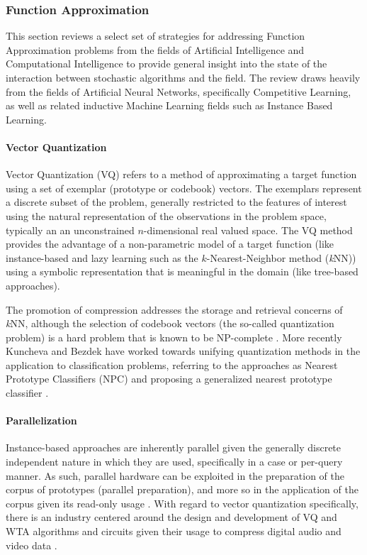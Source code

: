 %
%
\subsubsection{Function Approximation}
This section reviews a select set of strategies for addressing Function Approximation problems from the fields of Artificial Intelligence and Computational Intelligence to provide general insight into the state of the interaction between stochastic algorithms and the field. The review draws heavily from the fields of Artificial Neural Networks, specifically Competitive Learning, as well as related inductive Machine Learning fields such as Instance Based Learning.

\paragraph{Vector Quantization}
Vector Quantization (VQ) refers to a method of approximating a target function using a set of exemplar (prototype or codebook) vectors. The exemplars represent a discrete subset of the problem, generally restricted to the features of interest using the natural representation of the observations in the problem space, typically an an unconstrained $n$-dimensional real valued space. The VQ method provides the advantage of a non-parametric model of a target function (like instance-based and lazy learning such as the $k$-Nearest-Neighbor method (\emph{k}NN)) using a symbolic representation that is meaningful in the domain (like tree-based approaches). 

The promotion of compression addresses the storage and retrieval concerns of \emph{k}NN, although the selection of codebook vectors (the so-called quantization problem) is a hard problem that is known to be NP-complete \cite{Garey1982}. More recently Kuncheva and Bezdek have worked towards unifying quantization methods in the application to classification problems, referring to the approaches as Nearest Prototype Classifiers (NPC) and proposing a generalized nearest prototype classifier \cite{Kuncheva1998, Kuncheva1998a}.
	
\paragraph{Parallelization} 
Instance-based approaches are inherently parallel given the generally discrete independent nature in which they are used, specifically in a case or per-query manner. As such, parallel hardware can be exploited in the preparation of the corpus of prototypes (parallel preparation), and more so in the application of the corpus given its read-only usage \cite{Aamodt1994, Nagendra1996, Plaza1997}. With regard to vector quantization specifically, there is an industry centered around the design and development of VQ and WTA algorithms and circuits given their usage to compress digital audio and video data \cite{Nakada1999, Parhi1994}.
	
